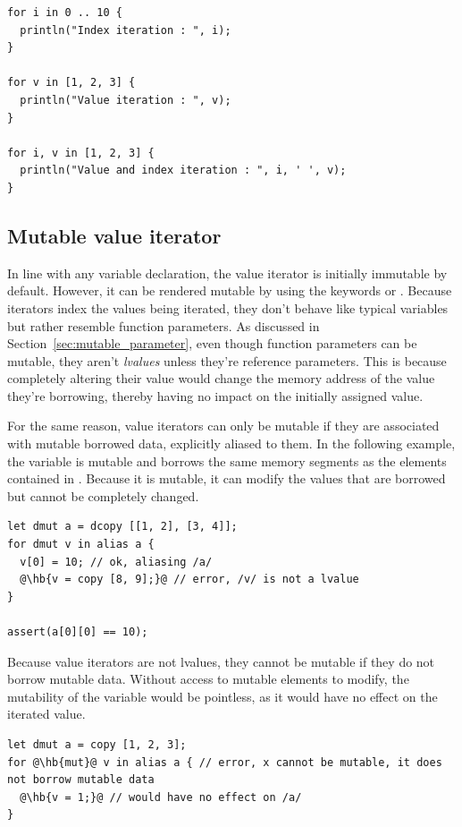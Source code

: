 \begin{lstlisting}[style=coloredverbatim, escapechar=@]
for i in 0 .. 10 {
  println("Index iteration : ", i);
}

for v in [1, 2, 3] {
  println("Value iteration : ", v);
}

for i, v in [1, 2, 3] {
  println("Value and index iteration : ", i, ' ', v);
}
\end{lstlisting}

\subsection{Mutable value iterator}
\label{sec:flow:mut_value_iterators}

In line with any variable declaration, the value iterator is initially immutable
by default. However, it can be rendered mutable by using the keywords
 or . Because iterators index the values being iterated,
they don't behave like typical variables but rather resemble function
parameters. As discussed in Section~\ref{sec:mutable_parameter}, even though
function parameters can be mutable, they aren't \textit{lvalues} unless they're
reference parameters. This is because completely altering their value would
change the memory address of the value they're borrowing, thereby having no
impact on the initially assigned value.

For the same reason, value iterators can only be mutable if they are associated
with mutable borrowed data, explicitly aliased to them. In the following
example, the variable  is mutable and borrows the same memory segments
as the elements contained in . Because it is mutable, it can modify
the values that are borrowed but cannot be completely changed.

\begin{lstlisting}[style=coloredverbatimError, escapechar=@]
let dmut a = dcopy [[1, 2], [3, 4]];
for dmut v in alias a {
  v[0] = 10; // ok, aliasing /a/
  @\hb{v = copy [8, 9];}@ // error, /v/ is not a lvalue
}

assert(a[0][0] == 10);
\end{lstlisting}

Because value iterators are not lvalues, they cannot be mutable if they do not
borrow mutable data. Without access to mutable elements to modify, the
mutability of the variable would be pointless, as it would have no effect on the
iterated value.

\begin{lstlisting}[style=coloredverbatimError, escapechar=@, caption=Useless mutable iterator, label=lst:flow:useless_mut_iterator]
let dmut a = copy [1, 2, 3];
for @\hb{mut}@ v in alias a { // error, x cannot be mutable, it does not borrow mutable data
  @\hb{v = 1;}@ // would have no effect on /a/
}
\end{lstlisting}

